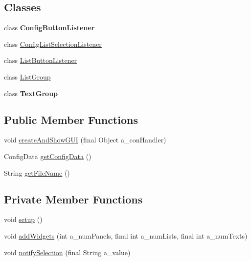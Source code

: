 \subsection*{Classes}
\begin{DoxyCompactItemize}
\item 
class {\bfseries Config\-Button\-Listener}
\item 
class \hyperlink{classorg_1_1jgap_1_1gui_1_1_config_frame_1_1_config_list_selection_listener}{Config\-List\-Selection\-Listener}
\item 
class \hyperlink{classorg_1_1jgap_1_1gui_1_1_config_frame_1_1_list_button_listener}{List\-Button\-Listener}
\item 
class \hyperlink{classorg_1_1jgap_1_1gui_1_1_config_frame_1_1_list_group}{List\-Group}
\item 
class {\bfseries Text\-Group}
\end{DoxyCompactItemize}
\subsection*{Public Member Functions}
\begin{DoxyCompactItemize}
\item 
void \hyperlink{classorg_1_1jgap_1_1gui_1_1_config_frame_a9f57a15d93fc0371d05270d587750eee}{create\-And\-Show\-G\-U\-I} (final Object a\-\_\-con\-Handler)
\item 
Config\-Data \hyperlink{classorg_1_1jgap_1_1gui_1_1_config_frame_af7cf4518c2c65aefe6f950534ae974b0}{get\-Config\-Data} ()
\item 
String \hyperlink{classorg_1_1jgap_1_1gui_1_1_config_frame_a6e8721198890f9b2372b39b32beb4215}{get\-File\-Name} ()
\end{DoxyCompactItemize}
\subsection*{Private Member Functions}
\begin{DoxyCompactItemize}
\item 
void \hyperlink{classorg_1_1jgap_1_1gui_1_1_config_frame_a0a1cbfde1ac15b4f66808b90de97e071}{setup} ()
\item 
void \hyperlink{classorg_1_1jgap_1_1gui_1_1_config_frame_a307133eeb12d75462ce9cb261b36a141}{add\-Widgets} (int a\-\_\-num\-Panels, final int a\-\_\-num\-Lists, final int a\-\_\-num\-Texts)
\item 
void \hyperlink{classorg_1_1jgap_1_1gui_1_1_config_frame_a82e8e3a7e54febeba650320750b1a84d}{notify\-Selection} (final String a\-\_\-value)
\end{DoxyCompactItemize}
